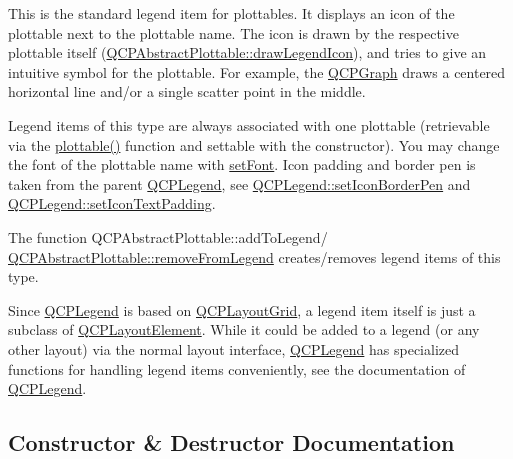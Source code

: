 This is the standard legend item for plottables. It displays an icon of the plottable next to the plottable name. The icon is drawn by the respective plottable itself (\mbox{\hyperlink{class_q_c_p_abstract_plottable_a9a450783fd9ed539e589999fd390cdf7}{Q\+C\+P\+Abstract\+Plottable\+::draw\+Legend\+Icon}}), and tries to give an intuitive symbol for the plottable. For example, the \mbox{\hyperlink{class_q_c_p_graph}{Q\+C\+P\+Graph}} draws a centered horizontal line and/or a single scatter point in the middle.

Legend items of this type are always associated with one plottable (retrievable via the \mbox{\hyperlink{class_q_c_p_plottable_legend_item_af29e9a2c60b4cba0cac2447b8af7b488}{plottable()}} function and settable with the constructor). You may change the font of the plottable name with \mbox{\hyperlink{class_q_c_p_abstract_legend_item_a409c53455d8112f71d70c0c43eb10265}{set\+Font}}. Icon padding and border pen is taken from the parent \mbox{\hyperlink{class_q_c_p_legend}{Q\+C\+P\+Legend}}, see \mbox{\hyperlink{class_q_c_p_legend_a2f2c93d18a651f4ff294bb3f026f49b8}{Q\+C\+P\+Legend\+::set\+Icon\+Border\+Pen}} and \mbox{\hyperlink{class_q_c_p_legend_a62973bd69d5155e8ea3141366e8968f6}{Q\+C\+P\+Legend\+::set\+Icon\+Text\+Padding}}.

The function Q\+C\+P\+Abstract\+Plottable\+::add\+To\+Legend/ \mbox{\hyperlink{class_q_c_p_abstract_plottable_a3cc235007e2343a65ad4f463767e0e20}{Q\+C\+P\+Abstract\+Plottable\+::remove\+From\+Legend}} creates/removes legend items of this type.

Since \mbox{\hyperlink{class_q_c_p_legend}{Q\+C\+P\+Legend}} is based on \mbox{\hyperlink{class_q_c_p_layout_grid}{Q\+C\+P\+Layout\+Grid}}, a legend item itself is just a subclass of \mbox{\hyperlink{class_q_c_p_layout_element}{Q\+C\+P\+Layout\+Element}}. While it could be added to a legend (or any other layout) via the normal layout interface, \mbox{\hyperlink{class_q_c_p_legend}{Q\+C\+P\+Legend}} has specialized functions for handling legend items conveniently, see the documentation of \mbox{\hyperlink{class_q_c_p_legend}{Q\+C\+P\+Legend}}. 

\subsection{Constructor \& Destructor Documentation}
\mbox{\label{class_q_c_p_plottable_legend_item_ac1072591fe409d3dabad51b23ee4d6c5}} 
